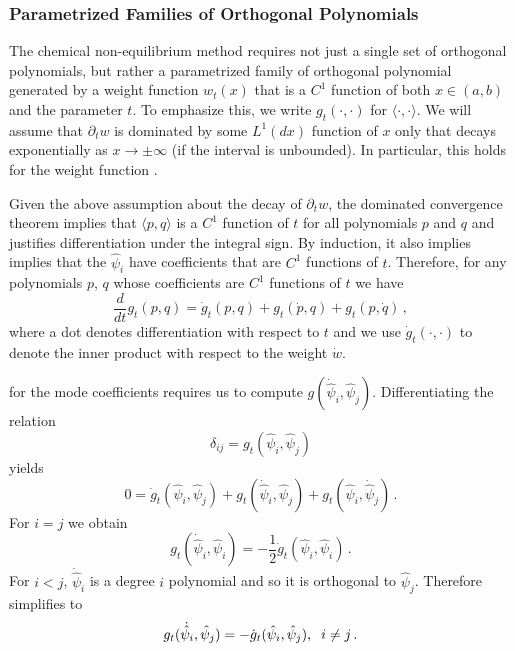 \subsubsection{Parametrized Families of Orthogonal Polynomials}\label{ortho-polynom-fam}
The chemical non-equilibrium method requires not just a single set of orthogonal polynomials, but rather a parametrized family of orthogonal polynomial generated by a weight function $w_t(x)$ that is a $C^1$ function of both $x\in(a,b)$ and the parameter $t$.  To emphasize this, we write $g_t(\cdot,\cdot)$ for $\langle\cdot,\cdot\rangle$.  We will assume that $\partial_t w$ is dominated by some $L^1(dx)$ function of $x$ only that decays exponentially as $x\rightarrow\pm\infty$ (if the interval is unbounded). In particular, this holds for the weight function .

Given the above assumption about the decay of $\partial_t w$, the dominated convergence theorem implies that $\langle p,q\rangle$ is a $C^1$ function of $t$ for all polynomials $p$ and $q$ and justifies  differentiation under the integral sign. By induction, it also implies implies that the $\hat\psi_i$ have coefficients that are $C^1$ functions of $t$. Therefore, for any polynomials $p$, $q$ whose coefficients are $C^1$ functions of $t$ we have
\begin{equation}
\frac{d}{dt}g_t( p,q)=\dot{g}_t(p,q)+g_t(\dot{p},q)+g_t( p,\dot{q})\,,
\end{equation}
where a dot denotes differentiation with respect to $t$ and we use $\dot{g}_t(\cdot,\cdot)$ to denote the inner product with respect to the weight $\dot{w}$.  

 for the mode coefficients requires us to compute $g(\dot{\hat\psi}_i,\hat\psi_j)$.  Differentiating the relation
\begin{equation}
\delta_{ij}=g_t(\hat\psi_i,\hat\psi_j)
\end{equation}
yields
\begin{equation}\label{ortho_deriv_eq}
0=\dot g_t(\hat\psi_i,\hat\psi_j)+g_t(\dot{\hat\psi}_i,\hat\psi_j)+g_t(\hat\psi_i,\dot{\hat\psi}_j)\,.
\end{equation}
For $i=j$ we obtain
\begin{equation}\label{norm_deriv_eq}
g_t(\dot{\hat\psi}_i,\hat\psi_i)=-\frac{1}{2}\dot{g}_t(\hat\psi_i,\hat\psi_i)\,.
\end{equation}
For $i<j$, $\dot{\hat\psi}_i$ is a degree $i$ polynomial and so it is orthogonal to $\hat\psi_j$. Therefore  simplifies to
\begin{equation}
g_t(\dot{\hat\psi}_i,\hat\psi_j)=-\dot{g}_t(\hat\psi_i,\hat\psi_j),\hspace{2mm} i\neq j\,.
\end{equation}

